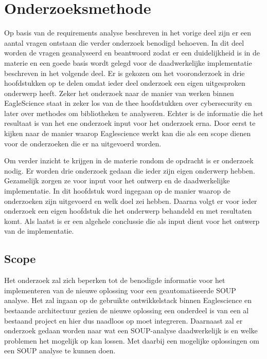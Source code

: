 


\chapter{Onderzoeksmethode}\label{ch:onderzoeksmethode} %

Op basis van de requirements analyse beschreven in het vorige deel zijn er een aantal vragen ontstaan die verder onderzoek benodigd behoeven. In dit deel worden de vragen geanalyseerd en beantwoord zodat er een duidelijkheid is in de materie en een goede basis wordt gelegd voor de daadwerkelijke implementatie beschreven in het volgende deel. Er is gekozen om het vooronderzoek in drie hoofdstukken op te delen omdat ieder deel onderzoek een eigen uitgesproken onderwerp heeft. Zeker het onderzoek naar de manier van werken binnen EagleScience staat in zeker los van de thee hoofdstukken over cybersecurity en later over methodes om bibliotheken te analyseren. Echter is de informatie die het resultaat is van het ene onderzoek input voor het onderzoek erna. Door eerst te kijken naar de manier waarop Eaglescience werkt kan die als een scope dienen voor de onderzoeken die er na uitgevoerd worden.

Om verder inzicht te krijgen in de materie rondom de opdracht is er onderzoek nodig. Er worden drie onderzoek gedaan die ieder zijn eigen onderwerp hebben. Gezamelijk zorgen ze voor input voor het ontwerp en de daadwerkelijke implementatie. In dit hoofdstuk word ingegaan op de manier waarop de onderzoeken zijn uitgevoerd en welk doel zei hebben. Daarna volgt er voor ieder onderzoek een eigen hoofdstuk die het onderwerp behandeld en met resultaten komt. Als laatst is er een algehele conclussie die als input dient voor het ontwerp van de implementatie.

\section{Scope}
Het onderzoek zal zich beperken tot de benodigde informatie voor het implementeren van de nieuwe oplossing voor een geautomatiseerde SOUP analyse.
Het zal ingaan op de gebruikte ontwikkelstack binnen Eaglescience en bestaande architectuur gezien de nieuwe oplossing een onderdeel is van een al bestaand project en hier dus naadloos op moet integreren.
Daarnaast zal er onderzoek gedaan worden naar wat een SOUP-analyse daadwerkelijk is en welke problemen het mogelijk op kan lossen.
Met daarbij een mogelijke oplossingen om een SOUP analyse te kunnen doen.

